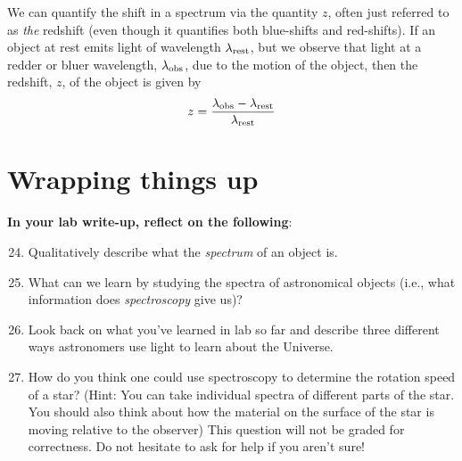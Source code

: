 \documentclass[11pt]{article}
\begin{document}
\medskip
We can quantify the shift in a spectrum via the quantity $z$, often just referred to as \emph{the} redshift (even though it quantifies both blue-shifts and red-shifts). If an object at rest emits light of wavelength $\lambda_{\rm rest}$, but we observe that light at a redder or bluer wavelength, $\lambda_{\rm obs}$, due to the motion of the object, then the redshift, $z$, of the object is given by
\begin{equation} \label{eq:redshift}
    z = \frac{\lambda_{\rm obs}-\lambda_{\rm rest}}{\lambda_{\rm rest}}
\end{equation}
\noindent


\section{Wrapping things up}
\textbf{In your lab write-up, reflect on the following}:
\begin{enumerate}
    \setcounter{enumi}{23}
    
    \item Qualitatively describe what the \emph{spectrum} of an object is.
    
    \item What can we learn by studying the spectra of astronomical objects (i.e., what information does \emph{spectroscopy} give us)?
    
    \item Look back on what you've learned in lab so far and describe three different ways astronomers use light to learn about the Universe.
    
    
    \item How do you think one could use spectroscopy to determine the rotation speed of a star? (Hint: You can take individual spectra of different parts of the star. You should also think about how the material on the surface of the star is moving relative to the observer) This question will not be graded for correctness. Do not hesitate to ask for help if you aren't sure!
    
    
\end{enumerate}
\end{document}
